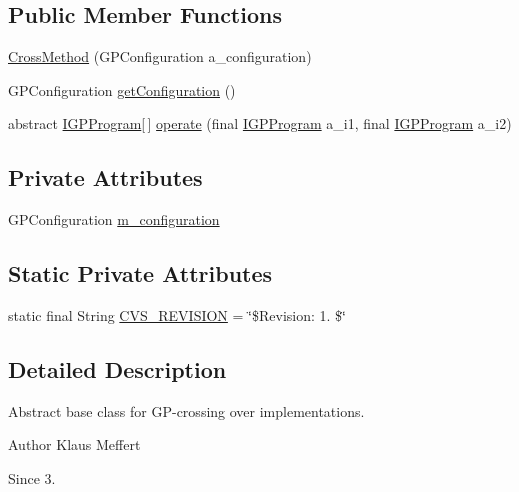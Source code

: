 \subsection*{Public Member Functions}
\begin{DoxyCompactItemize}
\item 
\hyperlink{classorg_1_1jgap_1_1gp_1_1_cross_method_ab6741ba96a9433b76de0db0ff173a1d6}{Cross\-Method} (G\-P\-Configuration a\-\_\-configuration)
\item 
G\-P\-Configuration \hyperlink{classorg_1_1jgap_1_1gp_1_1_cross_method_a643c076e032b4eb728109c68db3f469d}{get\-Configuration} ()
\item 
abstract \hyperlink{interfaceorg_1_1jgap_1_1gp_1_1_i_g_p_program}{I\-G\-P\-Program}\mbox{[}$\,$\mbox{]} \hyperlink{classorg_1_1jgap_1_1gp_1_1_cross_method_afe487df2227dfcb1bc80ad0beab6c342}{operate} (final \hyperlink{interfaceorg_1_1jgap_1_1gp_1_1_i_g_p_program}{I\-G\-P\-Program} a\-\_\-i1, final \hyperlink{interfaceorg_1_1jgap_1_1gp_1_1_i_g_p_program}{I\-G\-P\-Program} a\-\_\-i2)
\end{DoxyCompactItemize}
\subsection*{Private Attributes}
\begin{DoxyCompactItemize}
\item 
G\-P\-Configuration \hyperlink{classorg_1_1jgap_1_1gp_1_1_cross_method_a9e993405356cb6e3a8c5b02ae418273f}{m\-\_\-configuration}
\end{DoxyCompactItemize}
\subsection*{Static Private Attributes}
\begin{DoxyCompactItemize}
\item 
static final String \hyperlink{classorg_1_1jgap_1_1gp_1_1_cross_method_ab37830a9db64b4647b88a0a271d38e80}{C\-V\-S\-\_\-\-R\-E\-V\-I\-S\-I\-O\-N} = \char`\"{}\$Revision\-: 1. \$\char`\"{}
\end{DoxyCompactItemize}


\subsection{Detailed Description}
Abstract base class for G\-P-\/crossing over implementations.

\begin{DoxyAuthor}{Author}
Klaus Meffert 
\end{DoxyAuthor}
\begin{DoxySince}{Since}
3. 
\end{DoxySince}



